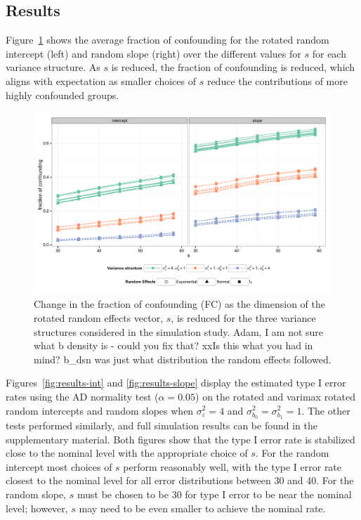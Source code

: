 \documentclass[12pt]{article} %
\newcommand{\hh}[1]{{\color{orange} #1}}
\newcommand{\al}[1]{{\color{red} #1}}
\begin{document}
\subsection{Results}\label{sec:sim-results}

Figure~\ref{fig:fc} shows the average fraction of confounding for the rotated random intercept (left) and random slope (right) over the different values for $s$ for each variance structure. As $s$ is reduced, the fraction of confounding is reduced, which aligns with expectation as smaller choices of $s$ reduce the contributions of more highly confounded groups.

\begin{figure}[h]
	\centering
	\includegraphics[width=\textwidth]{fc_by_s.pdf}
	\caption{\label{fig:fc} Change in the fraction of confounding (FC) as the dimension of the rotated random effects vector, $s$, is reduced for the three variance structures considered in the simulation study. %
	\hh{Adam, I am not sure what b density is - could you fix that?} \al{ xxIs this what you had in mind? b\_dsn was just what distribution the random effects followed.}
	}
\end{figure}

Figures~\ref{fig:results-int} and \ref{fig:results-slope} display the estimated type I error rates using the AD normality test ($\alpha = 0.05$) on the rotated and varimax rotated random intercepts and random slopes when $\sigma^2_\varepsilon = 4$ and $\sigma^2_{b_0} = \sigma^2_{b_1} = 1$. The other tests performed similarly, and full simulation results can be found in the supplementary material. Both figures show that the type I error rate is stabilized close to the nominal level with the appropriate choice of $s$. For the random intercept most choices of $s$ perform reasonably well, with the type I error rate closest to the nominal level for all error distributions between 30 and 40. For the random slope, $s$ must be chosen to be 30 for type I error to be near the nominal level; however, $s$ may need to be even smaller to achieve the nominal rate. 
\end{document}
